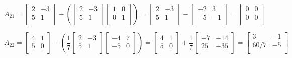 \documentclass{article}
\begin{document}
$$ A_{21} = \begin{bmatrix}
    2 & -3 \\
    5 & 1 \\ 
\end{bmatrix} - (\begin{bmatrix}
    2 & -3 \\
    5 & 1 \\ 
\end{bmatrix} \begin{bmatrix}
    1 & 0 \\ 
    0 & 1 \\
\end{bmatrix}) = \begin{bmatrix}
    2 & -3 \\
    5 & 1 \\ 
\end{bmatrix} - \begin{bmatrix}
    -2 & 3 \\
    -5 & -1 \\ 
\end{bmatrix} = \begin{bmatrix}
    0 & 0 \\
    0 & 0 \\ 
\end{bmatrix}$$

$$A_{22} = \begin{bmatrix}
    4 & 1 \\
    5 & 0 \\ 
\end{bmatrix} - (\frac{1}{7} \begin{bmatrix}
    2 & -3 \\
    5 & 1 \\ 
\end{bmatrix} \begin{bmatrix}
    -4 & 7 \\
    -5 & 0 \\ 
\end{bmatrix}) = \begin{bmatrix}
    4 & 1 \\
    5 & 0 \\ 
\end{bmatrix}+ \frac{1}{7} \begin{bmatrix}
    -7 & -14 \\
    25 & -35 \\
\end{bmatrix} = \begin{bmatrix}
    3 & -1 \\
    60/7 & -5 \\
\end{bmatrix}$$ 
\end{document}
